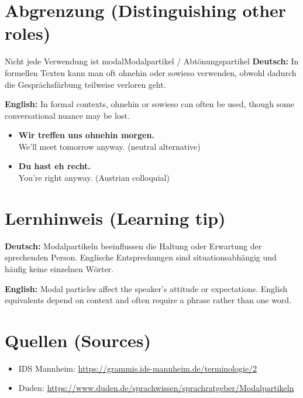 \documentclass[a4paper,11pt]{article}
\newcommand{\GermanText}[1]{\textbf{Deutsch: }#1\par}
\newcommand{\EnglishText}[1]{{\small\color{SoftGray}\textbf{English: }#1\par}}
\newcommand{\ExampleItem}[2]{\item \textbf{#1}\\{\small\color{SoftGray}#2}}
\begin{document}
\section{Abgrenzung \textnormal{(Distinguishing other roles)}}
\begin{grammarentry}{Nicht jede Verwendung ist modal}{Modalpartikel / Abtönungspartikel}
\GermanText{In formellen Texten kann man oft ohnehin oder sowieso verwenden, obwohl dadurch die Gesprächsfärbung teilweise verloren geht.}
\EnglishText{In formal contexts, ohnehin or sowieso can often be used, though some conversational nuance may be lost.}
\end{grammarentry}
\begin{exbox}\begin{itemize}
\ExampleItem{Wir treffen uns ohnehin morgen.}{We'll meet tomorrow anyway. (neutral alternative)}
\ExampleItem{Du hast eh recht.}{You're right anyway. (Austrian colloquial)}
\end{itemize}\end{exbox}
\section{Lernhinweis \textnormal{(Learning tip)}}
\GermanText{Modalpartikeln beeinflussen die Haltung oder Erwartung der sprechenden Person. Englische Entsprechungen sind situationsabhängig und häufig keine einzelnen Wörter.}
\EnglishText{Modal particles affect the speaker's attitude or expectations. English equivalents depend on context and often require a phrase rather than one word.}
\section{Quellen \textnormal{(Sources)}}
\begin{itemize}
\item IDS Mannheim: \url{https://grammis.ids-mannheim.de/terminologie/2}
\item Duden: \url{https://www.duden.de/sprachwissen/sprachratgeber/Modalpartikeln}
\end{itemize}
\end{document}

